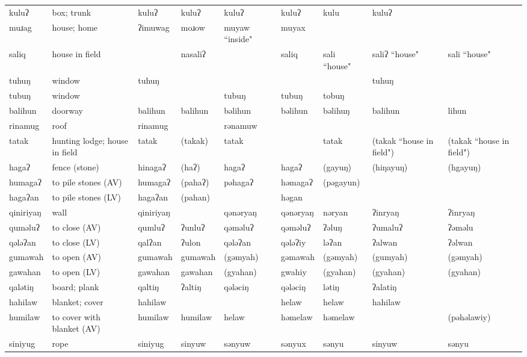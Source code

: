 \begin{landscape}
\begin{longtable}{*{9}{>{\raggedright\arraybackslash}p{}}}
\text{*}kuluʔ & box; trunk & kuluʔ & kuluʔ & kuluʔ & kuluʔ & kulu & kuluʔ & \\
\text{*}muɹag & house; home & ʔimuwag & moɹow & muyaw \newline ``inside" & muyax &  &  & \\
\text{*}saliq & house in field &  & nasaliʔ &  & saliq & sali ``house" & saliʔ ``house" & sali ``house"\\
\text{*}tuhuŋ & window & tuhuŋ &  &  &  &  & tuhuŋ & \\
\text{*}tubuŋ & window &  &  & tubuŋ & tubuŋ & tobuŋ &  & \\
\text{*}balihun & doorway & balihun & balihun & bəlihun & bəlihun & bəlihuŋ & balihun & lihun\\
\text{*}rinamug & roof & rinamug &  & rənamuw &  &  &  & \\
\text{*}tatak & hunting lodge; house in field & tatak & (takak) & tatak &  & tatak & (takak ``house in field") & (takak ``house in field")\\
\text{*}hagaʔ & fence (stone) & hinagaʔ & (haʔ) & hagaʔ & hagaʔ & (gayuŋ) & (hiŋayuŋ) & (hgayuŋ)\\
\text{*}humagaʔ & to pile stones (AV) & humagaʔ & (pahaʔ) & pəhagaʔ & həmagaʔ & (pəgayun) &  & \\
\text{*}hagaʔan & to pile stones (LV) & hagaʔan & (pahan) &  & həgan &  &  & \\
\text{*}qiniriyaŋ & wall & qiniriyaŋ &  & qənəryaŋ & qənəryaŋ & nəryan & ʔinryaŋ & ʔinryaŋ\\
\text{*}quməluʔ & to close (AV) & qumluʔ & ʔunluʔ & qəməluʔ & qəməluʔ & ʔəluŋ & ʔumaluʔ & ʔəməlu\\
\text{*}qələʔan & to close (LV) & qalʔan & ʔulon & qələʔan & qələʔiy & ləʔan & ʔalwan & ʔəlwan\\
\text{*}gumawah & to open (AV) & gumawah & gumawah & (gəmyah) & gəmawah & (gəmyah) & (gumyah) & (gəmyah)\\
\text{*}gawahan & to open (LV) & gawahan & gawahan & (gyahan) & gwahiy & (gyahan) & (gyahan) & (gyahan)\\
\text{*}qalətiŋ & board; plank & qaltiŋ & ʔaltiŋ & qələciŋ & qələciŋ & lətiŋ & ʔalatiŋ & \\
\text{*}hahilaw & blanket; cover & hahilaw &  &  & helaw & helaw & hahilaw & \\
\text{*}humilaw & to cover with blanket (AV) & humilaw & humilaw & helaw & həmelaw & həmelaw &  & (pəhəlawiy)\\
\text{*}siniyug & rope & siniyug & sinyuw & sənyuw & sənyux & sənyu & sinyuw & sənyu\\

\end{longtable}
\end{landscape}

